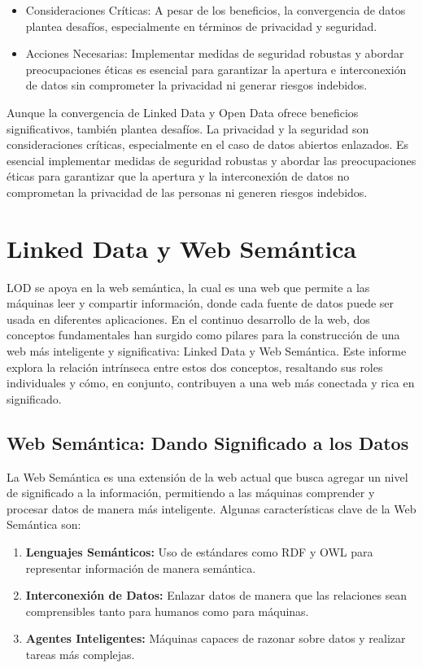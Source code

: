 \documentclass[11pt]{report}
\begin{document}
\begin{itemize}
  \item Consideraciones Críticas: A pesar de los beneficios, la convergencia de datos plantea desafíos, especialmente en términos de privacidad y seguridad.
  \item Acciones Necesarias: Implementar medidas de seguridad robustas y abordar preocupaciones éticas es esencial para garantizar la apertura e interconexión de datos sin comprometer la privacidad ni generar riesgos indebidos.
\end{itemize}
		
		Aunque la convergencia de Linked Data y Open Data ofrece beneficios significativos, también plantea desafíos. La privacidad y la seguridad son consideraciones críticas, especialmente en el caso de datos abiertos enlazados. Es esencial implementar medidas de seguridad robustas y abordar las preocupaciones éticas para garantizar que la apertura y la interconexión de datos no comprometan la privacidad de las personas ni generen riesgos indebidos.
	\chapter{Linked Data y Web Semántica}
	LOD se apoya en la web semántica, la cual es
	una web que permite a las máquinas leer y
	compartir información, donde cada fuente de
	datos puede ser usada en diferentes aplicaciones. 
	En el continuo desarrollo de la web, dos conceptos fundamentales han surgido como pilares para la construcción de una web más inteligente y significativa: Linked Data y Web Semántica. Este informe explora la relación intrínseca entre estos dos conceptos, resaltando sus roles individuales y cómo, en conjunto, contribuyen a una web más conectada y rica en significado.
	
	\section{Web Semántica: Dando Significado a los Datos}
	
	La Web Semántica es una extensión de la web actual que busca agregar un nivel de significado a la información, permitiendo a las máquinas comprender y procesar datos de manera más inteligente. Algunas características clave de la Web Semántica son:
	
	\begin{enumerate}
		\item \textbf{Lenguajes Semánticos:} Uso de estándares como RDF y OWL para representar información de manera semántica.
	   
		\item \textbf{Interconexión de Datos:} Enlazar datos de manera que las relaciones sean comprensibles tanto para humanos como para máquinas.
		
		\item \textbf{Agentes Inteligentes:} Máquinas capaces de razonar sobre datos y realizar tareas más complejas.
	\end{enumerate}
		
\end{document}
